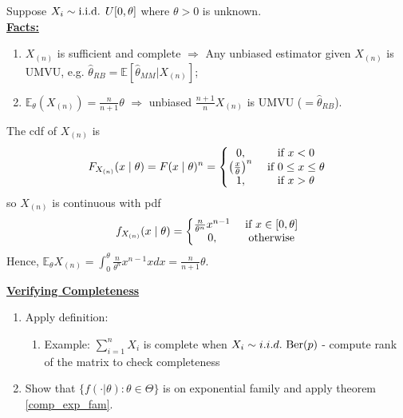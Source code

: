 \documentclass[11pt]{elegantbook}
\begin{document}
\begin{example}\quad
    Suppose $X_i\sim \textnormal{i.i.d. } U[0,\theta]$ where $\theta>0$ is unknown.\\
    \textbf{\underline{Facts:}}
    \begin{enumerate}[$\bullet$]
        \item $X_{(n)}$ is sufficient and complete $\Rightarrow$
        Any unbiased estimator given $X_{(n)}$ is UMVU, e.g. $\hat{\theta}_{RB}=\mathbb{E}[\hat{\theta}_{MM}|X_{(n)}]$;
        \item $\mathbb{E}_\theta(X_{(n)})=\frac{n}{n+1}\theta$ $\Rightarrow$ unbiased $\frac{n+1}{n}X_{(n)}$ is UMVU ($=\hat{\theta}_{RB}$).
    \end{enumerate}
    \begin{remark}
        The cdf of $X_{(n)}$ is
        \begin{equation}
            \begin{aligned}
                F_{X_{(n)}}(x\mid\theta)=F(x\mid\theta)^n=\left\{\begin{matrix}
                    0,&\textnormal{ if }x<0\\
                    \left(\frac{x}{\theta}\right)^n&\textnormal{ if }0\leq x\leq \theta\\
                    1,&\textnormal{ if }x>\theta
                \end{matrix}\right.
            \end{aligned}
            \nonumber
        \end{equation}
        so $X_{(n)}$ is continuous with pdf
        \begin{equation}
            \begin{aligned}
                f_{X_{(n)}}(x\mid\theta)=\left\{\begin{matrix}
                    \frac{n}{\theta^n}x^{n-1}&\textnormal{ if }x\in[0,\theta]\\
                    0,& \textnormal{ otherwise}
                \end{matrix}\right.
            \end{aligned}
            \nonumber
        \end{equation}
        Hence, $\mathbb{E}_\theta X_{(n)}=\int_0^\theta \frac{n}{\theta^n}x^{n-1} x dx = \frac{n}{n+1}\theta$.
    \end{remark}
\end{example}

\textbf{\underline{Verifying Completeness}}
\begin{enumerate}[$\bullet$]
    \item Apply definition:
    \begin{enumerate}[$\circ$]
        \item Example: $\sum_{i=1}^n X_i$ is complete when $X_i\sim i.i.d. \textnormal{ Ber}(p)$ - compute rank of the matrix to check completeness
    \end{enumerate}
    \item Show that $\{f(\cdot|\theta):\theta\in\Theta\}$ is on exponential family and apply theorem \ref{comp_exp_fam}.
\end{enumerate}
\end{document}
